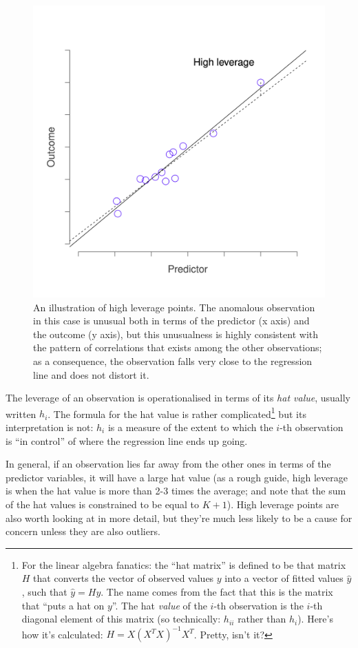 \documentclass[
  11pt,
  a4paper,
  twoside,symmetric,openright]{book}
\theoremstyle{break}
\theoremstyle{break}
\begin{document}
\begin{figure}

{\centering \includegraphics[width=0.6\linewidth]{resources/image/unusual_leverage} 

}

\caption{An illustration of high leverage points. The anomalous observation in this case is unusual both in terms of the predictor (x axis) and the outcome (y axis), but this unusualness is highly consistent with the pattern of correlations that exists among the other observations; as a consequence, the observation falls very close to the regression line and does not distort it.}\label{fig:leverage}
\end{figure}

The leverage of an observation is operationalised in terms of its \emph{hat value}, usually written \(h_i\). The formula for the hat value is rather complicated\footnote{For the linear algebra fanatics: the ``hat matrix'' is defined to be that matrix \(H\) that converts the vector of observed values \(y\) into a vector of fitted values \(\hat{y}\), such that \(\hat{y} = H y\). The name comes from the fact that this is the matrix that ``puts a hat on \(y\)''. The hat \emph{value} of the \(i\)-th observation is the \(i\)-th diagonal element of this matrix (so technically: \(h_{ii}\) rather than \(h_{i}\)). Here's how it's calculated: \(H = X(X^TX)^{-1} X^T\). Pretty, isn't it?} but its interpretation is not: \(h_i\) is a measure of the extent to which the \(i\)-th observation is ``in control'' of where the regression line ends up going.

In general, if an observation lies far away from the other ones in terms of the predictor variables, it will have a large hat value (as a rough guide, high leverage is when the hat value is more than 2-3 times the average; and note that the sum of the hat values is constrained to be equal to \(K+1\)). High leverage points are also worth looking at in more detail, but they're much less likely to be a cause for concern unless they are also outliers.
\end{document}
